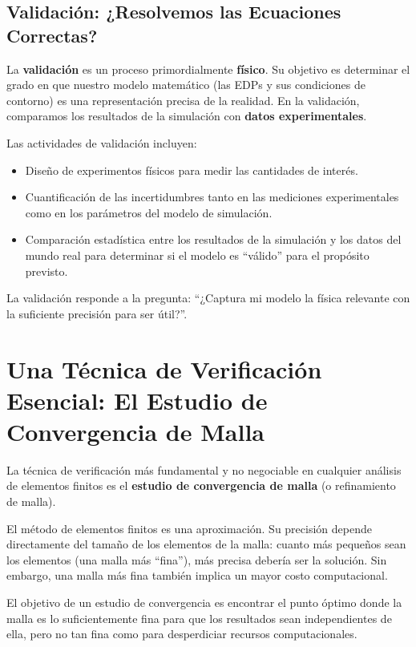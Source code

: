 \subsection{Validación: ¿Resolvemos las Ecuaciones Correctas?}
La \textbf{validación} es un proceso primordialmente \textbf{físico}. Su objetivo es determinar el grado en que nuestro modelo matemático (las EDPs y sus condiciones de contorno) es una representación precisa de la realidad. En la validación, comparamos los resultados de la simulación con \textbf{datos experimentales}.

Las actividades de validación incluyen:
\begin{itemize}
    \item Diseño de experimentos físicos para medir las cantidades de interés.
    \item Cuantificación de las incertidumbres tanto en las mediciones experimentales como en los parámetros del modelo de simulación.
    \item Comparación estadística entre los resultados de la simulación y los datos del mundo real para determinar si el modelo es ``válido'' para el propósito previsto.
\end{itemize}
La validación responde a la pregunta: ``¿Captura mi modelo la física relevante con la suficiente precisión para ser útil?''.

\section{Una Técnica de Verificación Esencial: El Estudio de Convergencia de Malla}
La técnica de verificación más fundamental y no negociable en cualquier análisis de elementos finitos es el \textbf{estudio de convergencia de malla} (o refinamiento de malla).

El método de elementos finitos es una aproximación. Su precisión depende directamente del tamaño de los elementos de la malla: cuanto más pequeños sean los elementos (una malla más ``fina''), más precisa debería ser la solución. Sin embargo, una malla más fina también implica un mayor costo computacional.

El objetivo de un estudio de convergencia es encontrar el punto óptimo donde la malla es lo suficientemente fina para que los resultados sean independientes de ella, pero no tan fina como para desperdiciar recursos computacionales.

